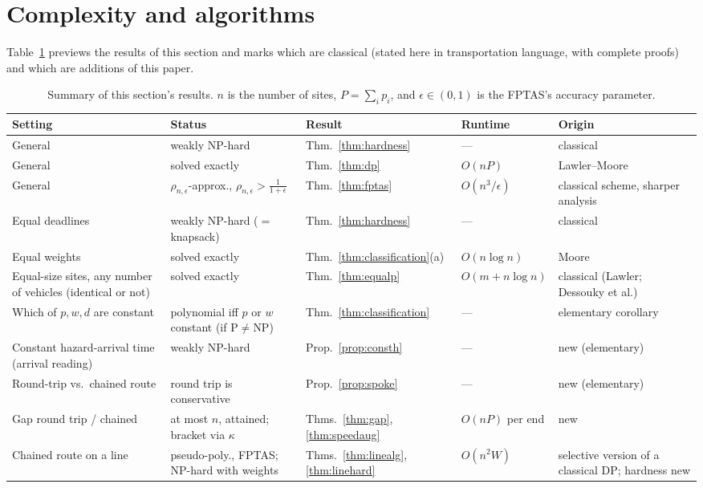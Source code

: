\documentclass[pdflatex,sn-mathphys-ay]{sn-jnl}
\theoremstyle{thmstyleone}
\theoremstyle{thmstyletwo}
\theoremstyle{thmstylethree}
\begin{document}
\section{Complexity and algorithms}\label{sec:theory}

Table~\ref{tab:summary} previews the results of this section and marks
which are classical (stated here in transportation language, with
complete proofs) and which are additions of this paper.

\begin{table}[h]
\caption{Summary of this section's results. $n$ is the number of
sites, $P=\sum_i p_i$, and $\epsilon\in(0,1)$ is the FPTAS's accuracy
parameter.}\label{tab:summary}
\small
\begin{tabular}{@{}p{2.4cm}p{2.5cm}p{1.6cm}p{1.5cm}p{1.75cm}@{}}
\toprule
Setting & Status & Result & Runtime & Origin \\
\midrule
General & weakly NP-hard & Thm.~\ref{thm:hardness} & --- & classical \\
General & solved exactly & Thm.~\ref{thm:dp} & $O(nP)$ & Lawler--Moore \\
General & $\rho_{n,\epsilon}$-approx., $\rho_{n,\epsilon}>\frac1{1+\epsilon}$ & Thm.~\ref{thm:fptas} & $O(n^3/\epsilon)$ & classical scheme, sharper analysis \\
Equal deadlines & weakly NP-hard ($=$ knapsack) & Thm.~\ref{thm:hardness} & --- & classical \\
Equal weights & solved exactly & Thm.~\ref{thm:classification}(a) & $O(n\log n)$ & Moore \\
Equal-size sites, any number of vehicles (identical or not) & solved exactly & Thm.~\ref{thm:equalp} & $O(m+n\log n)$ & classical (Lawler; Dessouky et al.) \\
Which of $p,w,d$ are constant & polynomial iff $p$ or $w$ constant (if P$\ne$NP) & Thm.~\ref{thm:classification} & --- & elementary corollary \\
Constant hazard-arrival time (arrival reading) & weakly NP-hard & Prop.~\ref{prop:consth} & --- & new (elementary) \\
Round-trip vs.\ chained route & round trip is conservative & Prop.~\ref{prop:spoke} & --- & new (elementary) \\
Gap round trip / chained & at most $n$, attained; bracket via $\kappa$ & Thms.~\ref{thm:gap}, \ref{thm:speedaug} & $O(nP)$ per end & new \\
Chained route on a line & pseudo-poly., FPTAS; NP-hard with weights & Thms.~\ref{thm:linealg}, \ref{thm:linehard} & $O(n^2W)$ & selective version of a classical DP; hardness new \\

\end{tabular}
\end{table}
\end{document}
